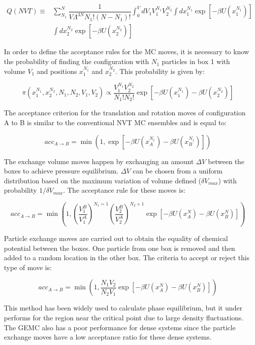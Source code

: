 \begin{equation}
\begin{aligned}
Q(NVT) {} \equiv & \sum_{N_{1}}^{N} \dfrac{1}{V \Lambda ^{3N} N_{1}!(N-N_{1})!} \int_{0}^{V} dV_{1} V_{1}^{N_{1}} V_{2}^{N_{2}} \int dx_{1}^{N_{1}} \exp[-\beta U(x_{1}^{N_{1}})] \\
& \int dx_{2}^{N_{2}} \exp[-\beta U(x_{2}^{N_{2}})]
\end{aligned}
\label{eqn:gepart}
\end{equation}

In order to define the acceptance rules for the MC moves, it is necessary to know the probability of finding the configuration with $N_{1}$ particles in box 1 with volume $V_{1}$ and positions $x_{1}^{N_{1}}$ and $x_{2}^{N_{2}}$. This probability is given by:

\begin{equation}
\pi(x_{1}^{N_{1}},x_{2}^{N_{2}},N_{1},N_{2},V_{1},V_{2}) \propto \dfrac{V_{1}^{N_{1}}V_{2}^{N_{2}}}{N_{1}!N_{2}!} \exp[-\beta U(x_{1}^{N_{1}}) -\beta U(x_{2}^{N_{2}})]
\label{eqn:geprob}
\end{equation}

The acceptance criterion for the translation and rotation moves of configuration A	to B is similar to the conventional NVT MC ensembles and is equal to:

\begin{equation}
acc_{A \rightarrow B} = \min(1,\exp[-\beta U(x_{A}^{N_{1}}) -\beta U(x_{B}^{N_{1}})])
\label{eqn:drprob}
\end{equation} 

The exchange volume moves happen by exchanging an amount $\Delta V$ between the boxes to achieve pressure equilibrium. $\Delta V$ can be chosen from a uniform distribution based on the maximum variation of volume defined ($\delta V_{max}$) with probability $1/\delta V_{max}$. The acceptance rule for these moves is: 

\begin{equation}
acc_{A \rightarrow B} = \min \left(1, \left(\dfrac{V_{1}^{B}}{V_{1}^{A}} \right)^{N_{1}=1} \left( \dfrac{V_{2}^{B}}{V_{2}^{A}} \right)^{N_{2}+1} \exp[-\beta U(x_{A}^{N}) -\beta U(x_{B}^{N})] \right)
\label{vprob}
\end{equation}

Particle exchange moves are carried out to obtain the equality of chemical potential between the boxes. One particle from one box is removed and then added to a random location in the other box. The criteria to accept or reject this type of move is:

\begin{equation}
acc_{A \rightarrow B} = \min \left( 1, \dfrac{N_{1}V_{2}}{N_{2}V_{1}}  \exp[-\beta U(x_{A}^{N}) -\beta U(x_{B}^{N})] \right)
\label{moleprob}
\end{equation}

This method has been widely used to calculate phase equilibrium, but it under performs for the region near the critical point due to large density fluctuations. The GEMC also has a poor performance for dense systems since the particle exchange moves have a low acceptance ratio for these dense systems.  





